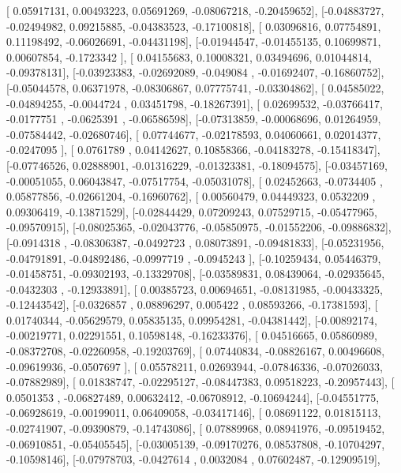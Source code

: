 \documentclass{article}
\begin{document}
       [ 0.05917131,  0.00493223,  0.05691269, -0.08067218, -0.20459652],
       [-0.04883727, -0.02494982,  0.09215885, -0.04383523, -0.17100818],
       [ 0.03096816,  0.07754891,  0.11198492, -0.06026691, -0.04431198],
       [-0.01944547, -0.01455135,  0.10699871,  0.00607854, -0.1723342 ],
       [ 0.04155683,  0.10008321,  0.03494696,  0.01044814, -0.09378131],
       [-0.03923383, -0.02692089, -0.049084  , -0.01692407, -0.16860752],
       [-0.05044578,  0.06371978, -0.08306867,  0.07775741, -0.03304862],
       [ 0.04585022, -0.04894255, -0.0044724 ,  0.03451798, -0.18267391],
       [ 0.02699532, -0.03766417, -0.0177751 , -0.0625391 , -0.06586598],
       [-0.07313859, -0.00068696,  0.01264959, -0.07584442, -0.02680746],
       [ 0.07744677, -0.02178593,  0.04060661,  0.02014377, -0.0247095 ],
       [ 0.0761789 ,  0.04142627,  0.10858366, -0.04183278, -0.15418347],
       [-0.07746526,  0.02888901, -0.01316229, -0.01323381, -0.18094575],
       [-0.03457169, -0.00051055,  0.06043847, -0.07517754, -0.05031078],
       [ 0.02452663, -0.0734405 ,  0.05877856, -0.02661204, -0.16960762],
       [ 0.00560479,  0.04449323,  0.0532209 ,  0.09306419, -0.13871529],
       [-0.02844429,  0.07209243,  0.07529715, -0.05477965, -0.09570915],
       [-0.08025365, -0.02043776, -0.05850975, -0.01552206, -0.09886832],
       [-0.0914318 , -0.08306387, -0.0492723 ,  0.08073891, -0.09481833],
       [-0.05231956, -0.04791891, -0.04892486, -0.0997719 , -0.0945243 ],
       [-0.10259434,  0.05446379, -0.01458751, -0.09302193, -0.13329708],
       [-0.03589831,  0.08439064, -0.02935645, -0.0432303 , -0.12933891],
       [ 0.00385723,  0.00694651, -0.08131985, -0.00433325, -0.12443542],
       [-0.0326857 ,  0.08896297,  0.005422  ,  0.08593266, -0.17381593],
       [ 0.01740344, -0.05629579,  0.05835135,  0.09954281, -0.04381442],
       [-0.00892174, -0.00219771,  0.02291551,  0.10598148, -0.16233376],
       [ 0.04516665,  0.05860989, -0.08372708, -0.02260958, -0.19203769],
       [ 0.07440834, -0.08826167,  0.00496608, -0.09619936, -0.0507697 ],
       [ 0.05578211,  0.02693944, -0.07846336, -0.07026033, -0.07882989],
       [ 0.01838747, -0.02295127, -0.08447383,  0.09518223, -0.20957443],
       [ 0.0501353 , -0.06827489,  0.00632412, -0.06708912, -0.10694244],
       [-0.04551775, -0.06928619, -0.00199011,  0.06409058, -0.03417146],
       [ 0.08691122,  0.01815113, -0.02741907, -0.09390879, -0.14743086],
       [ 0.07889968,  0.08941976, -0.09519452, -0.06910851, -0.05405545],
       [-0.03005139, -0.09170276,  0.08537808, -0.10704297, -0.10598146],
       [-0.07978703, -0.0427614 ,  0.0032084 ,  0.07602487, -0.12909519],
\end{document}
